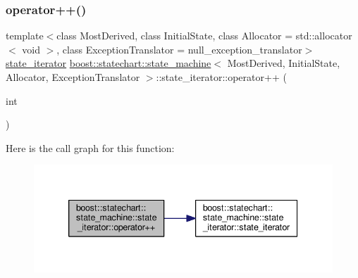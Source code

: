 \mbox{\label{classboost_1_1statechart_1_1state__machine_1_1state__iterator_a58a5b7610ab60fd7a3b546e6fef29429}} 
\subsubsection{\texorpdfstring{operator++()}{operator++()}\hspace{0.1cm}{\footnotesize\ttfamily [2/2]}}
{\footnotesize\ttfamily template$<$class Most\+Derived, class Initial\+State, class Allocator = std\+::allocator$<$ void $>$, class Exception\+Translator = null\+\_\+exception\+\_\+translator$>$ \\
\mbox{\hyperlink{classboost_1_1statechart_1_1state__machine_1_1state__iterator}{state\+\_\+iterator}} \mbox{\hyperlink{classboost_1_1statechart_1_1state__machine}{boost\+::statechart\+::state\+\_\+machine}}$<$ Most\+Derived, Initial\+State, Allocator, Exception\+Translator $>$\+::state\+\_\+iterator\+::operator++ (\begin{DoxyParamCaption}\item[{int}]{ }\end{DoxyParamCaption})\hspace{0.3cm}{\ttfamily [inline]}}

Here is the call graph for this function\+:
\nopagebreak
\begin{figure}[H]
\begin{center}
\leavevmode
\includegraphics[width=339pt]{classboost_1_1statechart_1_1state__machine_1_1state__iterator_a58a5b7610ab60fd7a3b546e6fef29429_cgraph}
\end{center}
\end{figure}
\mbox{\label{classboost_1_1statechart_1_1state__machine_1_1state__iterator_a1325f64435cdaf560063aab68eb3ca74}} 
